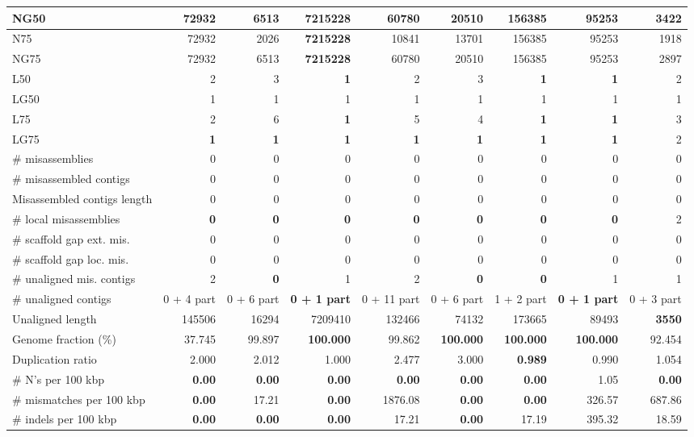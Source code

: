 \documentclass[12pt,a4paper]{article}
\begin{document}
\begin{table}[ht]
\begin{center}
\begin{tabular}{|l*{8}{|r}|}
NG50 & 72932 & 6513 & {\bf 7215228} & 60780 & 20510 & 156385 & 95253 & 3422 \\ \hline
N75 & 72932 & 2026 & {\bf 7215228} & 10841 & 13701 & 156385 & 95253 & 1918 \\ \hline
NG75 & 72932 & 6513 & {\bf 7215228} & 60780 & 20510 & 156385 & 95253 & 2897 \\ \hline
L50 & 2 & 3 & {\bf 1} & 2 & 3 & {\bf 1} & {\bf 1} & 2 \\ \hline
LG50 & 1 & 1 & 1 & 1 & 1 & 1 & 1 & 1 \\ \hline
L75 & 2 & 6 & {\bf 1} & 5 & 4 & {\bf 1} & {\bf 1} & 3 \\ \hline
LG75 & {\bf 1} & {\bf 1} & {\bf 1} & {\bf 1} & {\bf 1} & {\bf 1} & {\bf 1} & 2 \\ \hline
\# misassemblies & 0 & 0 & 0 & 0 & 0 & 0 & 0 & 0 \\ \hline
\# misassembled contigs & 0 & 0 & 0 & 0 & 0 & 0 & 0 & 0 \\ \hline
Misassembled contigs length & 0 & 0 & 0 & 0 & 0 & 0 & 0 & 0 \\ \hline
\# local misassemblies & {\bf 0} & {\bf 0} & {\bf 0} & {\bf 0} & {\bf 0} & {\bf 0} & {\bf 0} & 2 \\ \hline
\# scaffold gap ext. mis. & 0 & 0 & 0 & 0 & 0 & 0 & 0 & 0 \\ \hline
\# scaffold gap loc. mis. & 0 & 0 & 0 & 0 & 0 & 0 & 0 & 0 \\ \hline
\# unaligned mis. contigs & 2 & {\bf 0} & 1 & 2 & {\bf 0} & {\bf 0} & 1 & 1 \\ \hline
\# unaligned contigs & 0 + 4 part & 0 + 6 part & {\bf 0 + 1 part} & 0 + 11 part & 0 + 6 part & 1 + 2 part & {\bf 0 + 1 part} & 0 + 3 part \\ \hline
Unaligned length & 145506 & 16294 & 7209410 & 132466 & 74132 & 173665 & 89493 & {\bf 3550} \\ \hline
Genome fraction (\%) & 37.745 & 99.897 & {\bf 100.000} & 99.862 & {\bf 100.000} & {\bf 100.000} & {\bf 100.000} & 92.454 \\ \hline
Duplication ratio & 2.000 & 2.012 & 1.000 & 2.477 & 3.000 & {\bf 0.989} & 0.990 & 1.054 \\ \hline
\# N's per 100 kbp & {\bf 0.00} & {\bf 0.00} & {\bf 0.00} & {\bf 0.00} & {\bf 0.00} & {\bf 0.00} & 1.05 & {\bf 0.00} \\ \hline
\# mismatches per 100 kbp & {\bf 0.00} & 17.21 & {\bf 0.00} & 1876.08 & {\bf 0.00} & {\bf 0.00} & 326.57 & 687.86 \\ \hline
\# indels per 100 kbp & {\bf 0.00} & {\bf 0.00} & {\bf 0.00} & 17.21 & {\bf 0.00} & 17.19 & 395.32 & 18.59 \\ \hline

\end{tabular}
\end{center}
\end{table}
\end{document}
